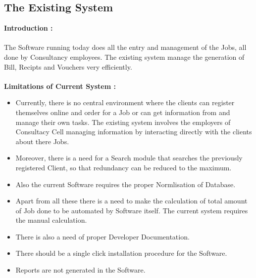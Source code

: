 \subsection{The Existing System}
\vskip 0.5cm
{\bf Introduction :}\\\\
The Software running today does all the entry and management of the Jobs, all done by Consultancy employees. The existing system manage the generation of Bill, Recipts and Vouchers very efficiently.\\\\
{\bf Limitations of Current System :}
\begin{itemize}
\item Currently, there is no central environment where the clients can register themselves online and order for a Job or can get information from and manage their own tasks. The existing system involves the employers of Consultacy Cell managing information by interacting directly with the clients about there Jobs.
\item Moreover, there is a need for a Search module that searches the previously registered Client, so that redundancy can be reduced to the maximum. 
\item Also the current Software requires the proper Normlisation of Database.
\item Apart from all these there is a need to make the calculation of total amount of Job done to be automated by Software itself. The current system requires the manual calculation. 
\item There is also a need of proper Developer Documentation.  
\item There should be a single click installation procedure for the Software.
\item Reports are not generated in the Software.
\end{itemize}

\newpage
